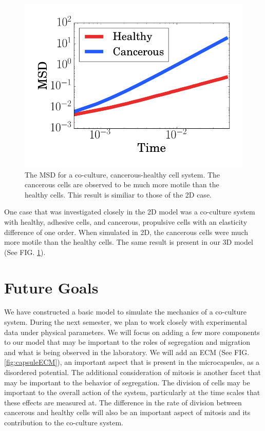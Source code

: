 \documentclass[aps,prb,twocolumn,groupedaddress,nofootinbib,floatfix]{revtex4}
\begin{document}
\begin{figure}
  \includegraphics[width=\columnwidth]{cocultureMSD.png}
  \caption[cocultureMSD]
    {The MSD for a co-culture, cancerous-healthy cell system. The cancerous cells
    are observed to be much more motile than the healthy cells. This result is
    similiar to those of the 2D case\cite{Butcher}.}
  \label{fig:cocultureMSD}
\end{figure}

One case that was investigated closely in the 2D model was a co-culture system 
with healthy, adhesive cells, and cancerous, propulsive cells with an elasticity 
difference of one order. When simulated in 2D, the cancerous cells were much 
more motile than the healthy cells. The same result is present in our 3D model 
(See FIG. \ref{fig:cocultureMSD}).

\section*{Future Goals}
We have constructed a basic model to simulate the mechanics of a co-culture system. During the next semester, we plan to work closely with experimental data under physical parameters. We will focus on adding a few more components to our model that may be important to the roles of segregation and migration and what is being observed in the laboratory.
We will add an ECM (See FIG. \ref{fig:capsuleECM}), an important aspect that is present in the microcapsules, as a disordered potential.
The additional consideration of mitosis is another facet that may be important to the behavior of segregation. The division of cells may be important to the overall action of the system, particularly at the time scales that these effects are measured at. The difference in the rate of division between cancerous and healthy cells will also be an important aspect of mitosis and its contribution to the co-culture system.
\end{document}
